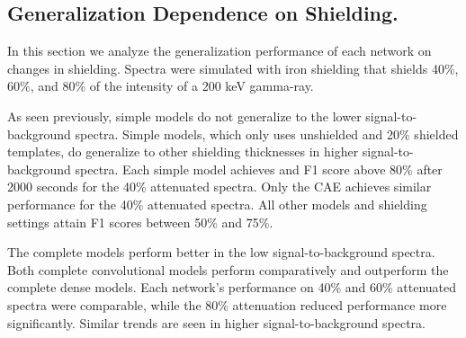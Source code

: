 \subsection{Generalization Dependence on Shielding.}

In this section we analyze the generalization performance of each network on changes in shielding. Spectra were simulated with iron shielding that shields 40\%, 60\%, and 80\% of the intensity of a 200 keV gamma-ray.

As seen previously, simple models do not generalize to the lower signal-to-background spectra. Simple models, which only uses unshielded and 20\% shielded templates, do generalize to other shielding thicknesses in higher signal-to-background spectra. Each simple model achieves and F1 score above 80\% after 2000 seconds for the 40\% attenuated spectra. Only the CAE achieves similar performance for the 40\% attenuated spectra. All other models and shielding settings attain F1 scores between 50\% and 75\%.

The complete models perform better in the low signal-to-background spectra. Both complete convolutional models perform comparatively and outperform the complete dense models. Each network's performance on 40\% and 60\% attenuated spectra were comparable, while the 80\% attenuation reduced performance more significantly. Similar trends are seen in higher signal-to-background spectra. 


